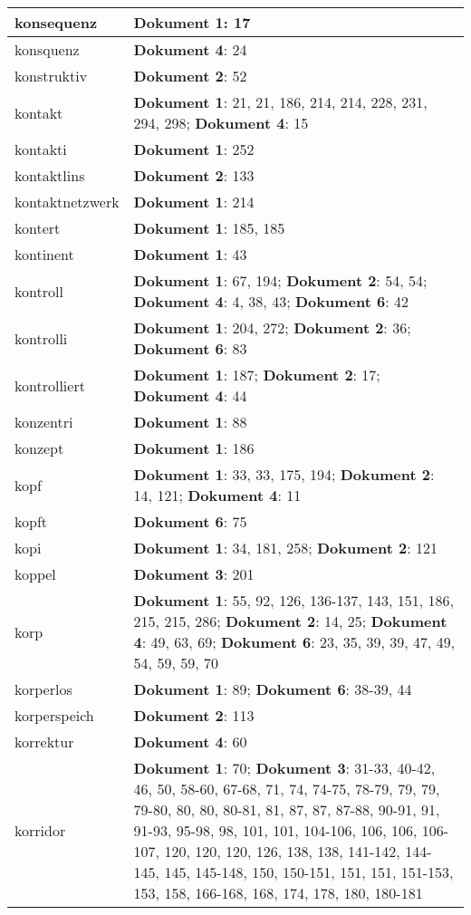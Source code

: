 \documentclass[a5paper]{article}
\begin{document}
\begin{longtable}[l]{|l|p{3in}|}
\hline
konsequenz & \textbf{Dokument 1}: 17 \\
\hline
konsquenz & \textbf{Dokument 4}: 24 \\
\hline
konstruktiv & \textbf{Dokument 2}: 52 \\
\hline
kontakt & \textbf{Dokument 1}: 21, 21, 186, 214, 214, 228, 231, 294, 298; \textbf{Dokument 4}: 15 \\
\hline
kontakti & \textbf{Dokument 1}: 252 \\
\hline
kontaktlins & \textbf{Dokument 2}: 133 \\
\hline
kontaktnetzwerk & \textbf{Dokument 1}: 214 \\
\hline
kontert & \textbf{Dokument 1}: 185, 185 \\
\hline
kontinent & \textbf{Dokument 1}: 43 \\
\hline
kontroll & \textbf{Dokument 1}: 67, 194; \textbf{Dokument 2}: 54, 54; \textbf{Dokument 4}: 4, 38, 43; \textbf{Dokument 6}: 42 \\
\hline
kontrolli & \textbf{Dokument 1}: 204, 272; \textbf{Dokument 2}: 36; \textbf{Dokument 6}: 83 \\
\hline
kontrolliert & \textbf{Dokument 1}: 187; \textbf{Dokument 2}: 17; \textbf{Dokument 4}: 44 \\
\hline
konzentri & \textbf{Dokument 1}: 88 \\
\hline
konzept & \textbf{Dokument 1}: 186 \\
\hline
kopf & \textbf{Dokument 1}: 33, 33, 175, 194; \textbf{Dokument 2}: 14, 121; \textbf{Dokument 4}: 11 \\
\hline
kopft & \textbf{Dokument 6}: 75 \\
\hline
kopi & \textbf{Dokument 1}: 34, 181, 258; \textbf{Dokument 2}: 121 \\
\hline
koppel & \textbf{Dokument 3}: 201 \\
\hline
korp & \textbf{Dokument 1}: 55, 92, 126, 136-137, 143, 151, 186, 215, 215, 286; \textbf{Dokument 2}: 14, 25; \textbf{Dokument 4}: 49, 63, 69; \textbf{Dokument 6}: 23, 35, 39, 39, 47, 49, 54, 59, 59, 70 \\
\hline
korperlos & \textbf{Dokument 1}: 89; \textbf{Dokument 6}: 38-39, 44 \\
\hline
korperspeich & \textbf{Dokument 2}: 113 \\
\hline
korrektur & \textbf{Dokument 4}: 60 \\
\hline
korridor & \textbf{Dokument 1}: 70; \textbf{Dokument 3}: 31-33, 40-42, 46, 50, 58-60, 67-68, 71, 74, 74-75, 78-79, 79, 79, 79-80, 80, 80, 80-81, 81, 87, 87, 87-88, 90-91, 91, 91-93, 95-98, 98, 101, 101, 104-106, 106, 106, 106-107, 120, 120, 120, 126, 138, 138, 141-142, 144-145, 145, 145-148, 150, 150-151, 151, 151, 151-153, 153, 158, 166-168, 168, 174, 178, 180, 180-181 \\

\end{longtable}
\end{document}
